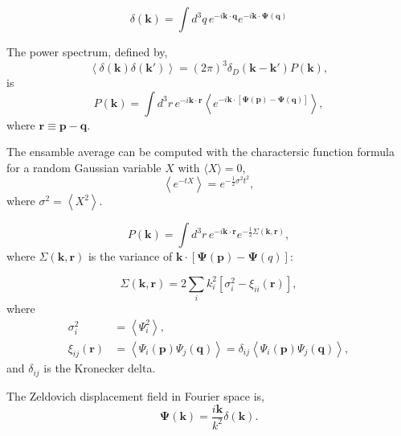 \documentclass[a4paper,11pt]{article}
\begin{document}
\begin{equation}
  \delta(\bm{k}) = \int d^3 q \, e^{-i \bm{k} \cdot \bm{q}}
                                 e^{-i \bm{k} \cdot \bm{\Psi}(\bm{q})}
\end{equation}

The power spectrum, defined by,
\begin{equation}
  \left\langle \delta(\bm{k}) \delta(\bm{k}') \right\rangle
  = (2\pi)^3 \delta_D(\bm{k} - \bm{k}') P(\bm{k}),
\end{equation}
is
\begin{equation}
  P(\bm{k}) = \int d^3 r \,  e^{-i \bm{k} \cdot \bm{r}} \left \langle
  e^{-i \bm{k} \cdot \left[ \bm{\Psi}(\bm{p}) - \bm{\Psi}(\bm{q}) \right]} \right \rangle,
\end{equation}
where $\bm{r} \equiv \bm{p} - \bm{q}$.

The ensamble average can be computed with the charactersic function formula
for a random Gaussian variable $X$ with $\langle X \rangle = 0$,
\begin{equation}
  \left\langle e^{-t X} \right\rangle = e^{-\frac{1}{2} \sigma^2 t^2},
\end{equation}
where $\sigma^2 = \left\langle X^2 \right\rangle$.

\begin{equation}
  P(\bm{k}) = \int d^3 r \, e^{-i \bm{k} \cdot \bm{r}}
    e^{-\frac{1}{2} \Sigma(\bm{k}, \bm{r})},
\end{equation}
where $\Sigma(\bm{k}, \bm{r})$ is the variance of $\bm{k} \cdot \left[
  \bm{\Psi}(\bm{p}) - \bm{\Psi}(q) \right]$:

\begin{equation}
  \Sigma(\bm{k}, \bm{r}) = 2 \sum_i k_i^2 \left[ \sigma_i^2 - \xi_{ii}(\bm{r}) \right],
\end{equation}
where
\begin{align}
  \sigma^2_i       &= \left\langle \Psi_i^2 \right\rangle,\\
  \xi_{ij}(\bm{r}) &= \left\langle \Psi_i(\bm{p}) \Psi_j(\bm{q}) \right\rangle
                   = \delta_{ij} \left\langle \Psi_i(\bm{p}) \Psi_j(\bm{q}) \right\rangle,
\end{align}
and $\delta_{ij}$ is the Kronecker delta.

The Zeldovich displacement field in Fourier space is,
\begin{equation}
  \bm{\Psi}(\bm{k}) = \frac{i\bm{k}}{k^2} \delta(\bm{k}).
\end{equation}
\end{document}
